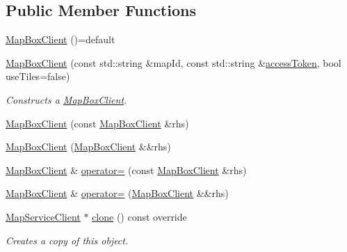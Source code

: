 \subsection*{Public Member Functions}
\begin{DoxyCompactItemize}
\item 
\hyperlink{classdg_1_1deepcore_1_1imagery_1_1_map_box_client_a70e2f2865377dfdf9bc35c87b4506c97}{Map\+Box\+Client} ()=default
\item 
\hyperlink{group___imagery_module_gaa985473361a183892437e5a57175aa25}{Map\+Box\+Client} (const std\+::string \&map\+Id, const std\+::string \&\hyperlink{group___imagery_module_ga09b8428dd2d706d2816a06509cdefdf3}{access\+Token}, bool use\+Tiles=false)
\begin{DoxyCompactList}\small\item\em Constructs a \hyperlink{classdg_1_1deepcore_1_1imagery_1_1_map_box_client}{Map\+Box\+Client}. \end{DoxyCompactList}\item 
\hyperlink{classdg_1_1deepcore_1_1imagery_1_1_map_box_client_ae46ec2247949f1fda28ce9eb6631675b}{Map\+Box\+Client} (const \hyperlink{classdg_1_1deepcore_1_1imagery_1_1_map_box_client}{Map\+Box\+Client} \&rhs)
\item 
\hyperlink{classdg_1_1deepcore_1_1imagery_1_1_map_box_client_a07358e9bf27adaf6bb1aacdae9065bdc}{Map\+Box\+Client} (\hyperlink{classdg_1_1deepcore_1_1imagery_1_1_map_box_client}{Map\+Box\+Client} \&\&rhs)
\item 
\hyperlink{classdg_1_1deepcore_1_1imagery_1_1_map_box_client}{Map\+Box\+Client} \& \hyperlink{classdg_1_1deepcore_1_1imagery_1_1_map_box_client_ad36c6e86694856d0333cea0c9b3b6cb0}{operator=} (const \hyperlink{classdg_1_1deepcore_1_1imagery_1_1_map_box_client}{Map\+Box\+Client} \&rhs)
\item 
\hyperlink{classdg_1_1deepcore_1_1imagery_1_1_map_box_client}{Map\+Box\+Client} \& \hyperlink{classdg_1_1deepcore_1_1imagery_1_1_map_box_client_a8610ac3dbbbcf04e542886fc8ff7c186}{operator=} (\hyperlink{classdg_1_1deepcore_1_1imagery_1_1_map_box_client}{Map\+Box\+Client} \&\&rhs)
\item 
\hyperlink{classdg_1_1deepcore_1_1imagery_1_1_map_service_client}{Map\+Service\+Client} $\ast$ \hyperlink{classdg_1_1deepcore_1_1imagery_1_1_map_box_client_a86688655b43ca268e6b73e7539bf1679}{clone} () const override
\begin{DoxyCompactList}\small\item\em Creates a copy of this object. \end{DoxyCompactList}\item 

\end{DoxyCompactItemize}

